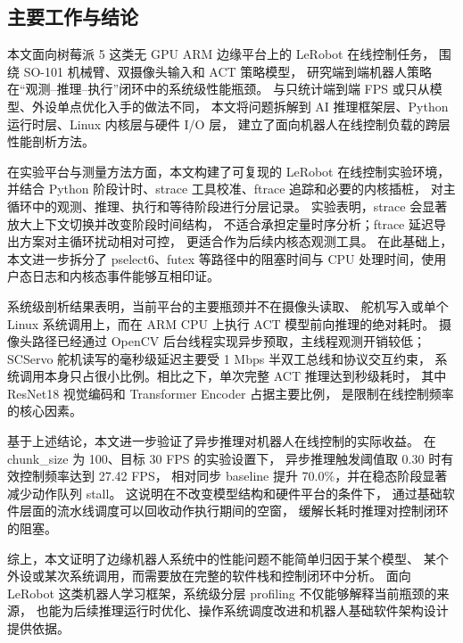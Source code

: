 
\begin{conclusion}
\begingroup
\setcounter{section}{0}
\renewcommand{\thesection}{\arabic{section}}
\renewcommand{\theHsection}{conclusion.\arabic{section}}

\section{主要工作与结论}

本文面向树莓派 5 这类无 GPU ARM 边缘平台上的 LeRobot 在线控制任务，
围绕 SO-101 机械臂、双摄像头输入和 ACT 策略模型，
研究端到端机器人策略在“观测--推理--执行”闭环中的系统级性能瓶颈。
与只统计端到端 FPS 或只从模型、外设单点优化入手的做法不同，
本文将问题拆解到 AI 推理框架层、Python 运行时层、Linux 内核层与硬件 I/O 层，
建立了面向机器人在线控制负载的跨层性能剖析方法。

在实验平台与测量方法方面，本文构建了可复现的 LeRobot 在线控制实验环境，
并结合 Python 阶段计时、strace 工具校准、ftrace 追踪和必要的内核插桩，
对主循环中的观测、推理、执行和等待阶段进行分层记录。
实验表明，strace 会显著放大上下文切换并改变阶段时间结构，
不适合承担定量时序分析；ftrace 延迟导出方案对主循环扰动相对可控，
更适合作为后续内核态观测工具。
在此基础上，本文进一步拆分了 pselect6、futex
等路径中的阻塞时间与 CPU 处理时间，使用户态日志和内核态事件能够互相印证。

系统级剖析结果表明，当前平台的主要瓶颈并不在摄像头读取、
舵机写入或单个 Linux 系统调用上，而在 ARM CPU 上执行 ACT 模型前向推理的绝对耗时。
摄像头路径已经通过 OpenCV 后台线程实现异步预取，主线程观测开销较低；
SCServo 舵机读写的毫秒级延迟主要受 1 Mbps 半双工总线和协议交互约束，
系统调用本身只占很小比例。相比之下，单次完整 ACT 推理达到秒级耗时，
其中 ResNet18 视觉编码和 Transformer Encoder 占据主要比例，
是限制在线控制频率的核心因素。

基于上述结论，本文进一步验证了异步推理对机器人在线控制的实际收益。
在 chunk\_size 为 100、目标 30 FPS 的实验设置下，
异步推理触发阈值取 0.30 时有效控制频率达到 27.42 FPS，
相对同步 baseline 提升 70.0\%，并在稳态阶段显著减少动作队列 stall。
这说明在不改变模型结构和硬件平台的条件下，
通过基础软件层面的流水线调度可以回收动作执行期间的空窗，
缓解长耗时推理对控制闭环的阻塞。

综上，本文证明了边缘机器人系统中的性能问题不能简单归因于某个模型、
某个外设或某次系统调用，而需要放在完整的软件栈和控制闭环中分析。
面向 LeRobot 这类机器人学习框架，系统级分层 profiling 不仅能够解释当前瓶颈的来源，
也能为后续推理运行时优化、操作系统调度改进和机器人基础软件架构设计提供依据。


\end{conclusion}
